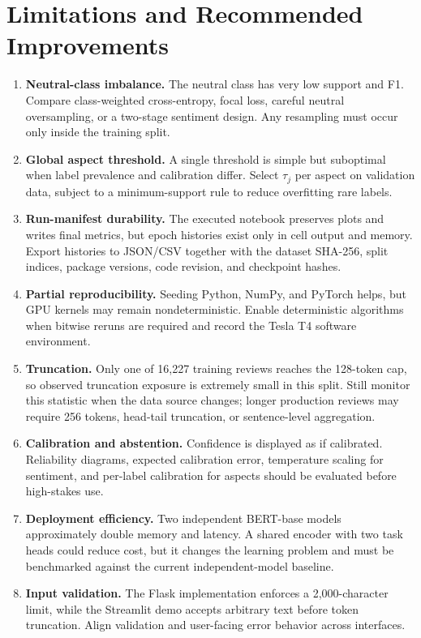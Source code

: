\documentclass[11pt,a4paper]{report}
\begin{document}
\chapter{Limitations and Recommended Improvements}

\begin{enumerate}[leftmargin=*]
  \item \textbf{Neutral-class imbalance.}  The neutral class has very low support and F1.  Compare class-weighted cross-entropy, focal loss, careful neutral oversampling, or a two-stage sentiment design.  Any resampling must occur only inside the training split.
  \item \textbf{Global aspect threshold.}  A single threshold is simple but suboptimal when label prevalence and calibration differ.  Select \(\tau_j\) per aspect on validation data, subject to a minimum-support rule to reduce overfitting rare labels.
  \item \textbf{Run-manifest durability.}  The executed notebook preserves plots and writes final metrics, but epoch histories exist only in cell output and memory.  Export histories to JSON/CSV together with the dataset SHA-256, split indices, package versions, code revision, and checkpoint hashes.
  \item \textbf{Partial reproducibility.}  Seeding Python, NumPy, and PyTorch helps, but GPU kernels may remain nondeterministic.  Enable deterministic algorithms when bitwise reruns are required and record the Tesla T4 software environment.
  \item \textbf{Truncation.}  Only one of 16,227 training reviews reaches the 128-token cap, so observed truncation exposure is extremely small in this split.  Still monitor this statistic when the data source changes; longer production reviews may require 256 tokens, head-tail truncation, or sentence-level aggregation.
  \item \textbf{Calibration and abstention.}  Confidence is displayed as if calibrated.  Reliability diagrams, expected calibration error, temperature scaling for sentiment, and per-label calibration for aspects should be evaluated before high-stakes use.
  \item \textbf{Deployment efficiency.}  Two independent BERT-base models approximately double memory and latency.  A shared encoder with two task heads could reduce cost, but it changes the learning problem and must be benchmarked against the current independent-model baseline.
  \item \textbf{Input validation.}  The Flask implementation enforces a 2,000-character limit, while the Streamlit demo accepts arbitrary text before token truncation.  Align validation and user-facing error behavior across interfaces.
\end{enumerate}
\end{document}
